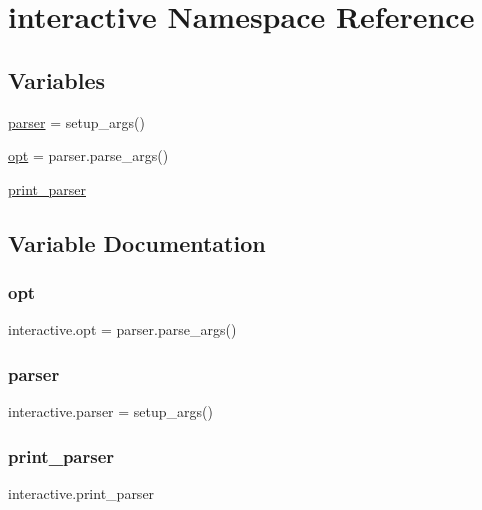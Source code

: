 \hypertarget{namespaceinteractive}{}\section{interactive Namespace Reference}
\label{namespaceinteractive}
\subsection*{Variables}
\begin{DoxyCompactItemize}
\item 
\hyperlink{namespaceinteractive_affc28a281e9fbc688b1515e62dc694db}{parser} = setup\+\_\+args()
\item 
\hyperlink{namespaceinteractive_a4b1cc0a00aa97ce62621d2a9996fe6ff}{opt} = parser.\+parse\+\_\+args()
\item 
\hyperlink{namespaceinteractive_abf63ff4b74ab5876420db088893db0f7}{print\+\_\+parser}
\end{DoxyCompactItemize}


\subsection{Variable Documentation}
\mbox{\label{namespaceinteractive_a4b1cc0a00aa97ce62621d2a9996fe6ff}} 
\subsubsection{\texorpdfstring{opt}{opt}}
{\footnotesize\ttfamily interactive.\+opt = parser.\+parse\+\_\+args()}

\mbox{\label{namespaceinteractive_affc28a281e9fbc688b1515e62dc694db}} 
\subsubsection{\texorpdfstring{parser}{parser}}
{\footnotesize\ttfamily interactive.\+parser = setup\+\_\+args()}

\mbox{\label{namespaceinteractive_abf63ff4b74ab5876420db088893db0f7}} 
\subsubsection{\texorpdfstring{print\+\_\+parser}{print\_parser}}
{\footnotesize\ttfamily interactive.\+print\+\_\+parser}

